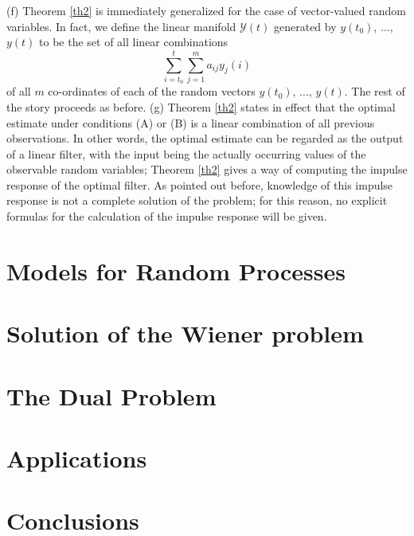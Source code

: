\documentclass{article}
\newcommand{\manf}[1]{\mathbf{\mathcal{#1}}}
\begin{document}
(f) Theorem \ref{th2} is immediately generalized for the case of vector-valued random variables. In fact, we define the linear manifold $\manf{Y}(t)$ generated by $y(t_0)$, $\dotsc$, $y(t)$ to be the set of all linear combinations
\begin{equation*}
\sum^t_{i=t_0}\sum^m_{j=1}a_{ij}y_j (i)
\end{equation*}
of all $m$ co-ordinates of each of the random vectors $y(t_0)$, $\dotsc$, $y(t)$. The rest of the story proceeds as before.
(g) Theorem \ref{th2} states in effect that the optimal estimate under conditions (A) or (B) is a linear combination of all previous observations. In other words, the optimal estimate can be regarded as the output of a linear filter, with the input being the actually occurring values of the observable random variables; Theorem \ref{th2} gives a way of computing the impulse response of the optimal filter. As pointed out before, knowledge of this impulse response is not a complete solution of the problem; for this reason, no explicit formulas for the calculation of the impulse response will be given.
\section{Models for Random Processes}
\section{Solution of the Wiener problem}
\section{The Dual Problem}
\section{Applications}
\section{Conclusions}
\end{document}
